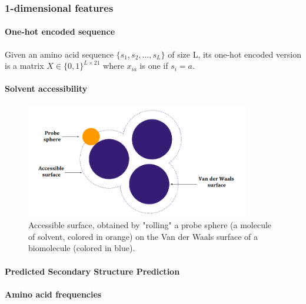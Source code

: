     \subsubsection{1-dimensional features}

        \paragraph{One-hot encoded sequence}

            Given an amino acid sequence $\{s_1, s_2, \ldots,
            s_L\}$ of size L, its one-hot encoded version
            is a matrix $X \in \{0, 1\}^{L \times 21}$
            where $x_{ia}$ is one if $s_i = a$.

        \paragraph{Solvent accessibility}

            \todo{}

            \begin{figure}[H]
                \begin{center}
                    \includegraphics[height=5cm, keepaspectratio]{imgs/accessibility.png}
                    \caption{Accessible surface, obtained by "rolling" a probe sphere (a molecule
                        of solvent, colored in orange) on the Van der Waals surface of a biomolecule
                        (colored in blue).}
                    \label{architecture}
                \end{center}
            \end{figure}


        \paragraph{Predicted Secondary Structure Prediction}

            \todo{}

        \paragraph{Amino acid frequencies}

